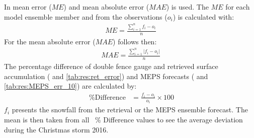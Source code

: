 In  mean error ($ME$) and mean absolute error ($MAE$) is used. The $ME$ for each model ensemble member and from the observations ($o_i$) is calculated with: 
\begin{align}
ME = \frac{\sum_{i=1}^n f_i - o_i}{n}
\end{align}
For the mean absolute error ($MAE$) follows then:
\begin{align}
MAE = \frac{\sum_{i=1}^n \left| f_i - o_i\right|}{n} \label{eq:MAE}
\end{align}
%
The percentage difference of double fence gauge and retrieved surface accumulation ( and \ref{tab:res:ret_error}) and MEPS forecasts ( and \ref{tab:res:MEPS_err_10}) are calculated by:
\begin{align}
\SI{}{\percent} \text{Difference} & = \frac{f_i - o_i}{o_i} \times 100
\end{align}
$f_i$ presents the snowfall from the retrieval or the MEPS ensemble forecast. The mean is then taken from all \SI{}{\percent} Difference values to see the average deviation during the Christmas storm 2016.


